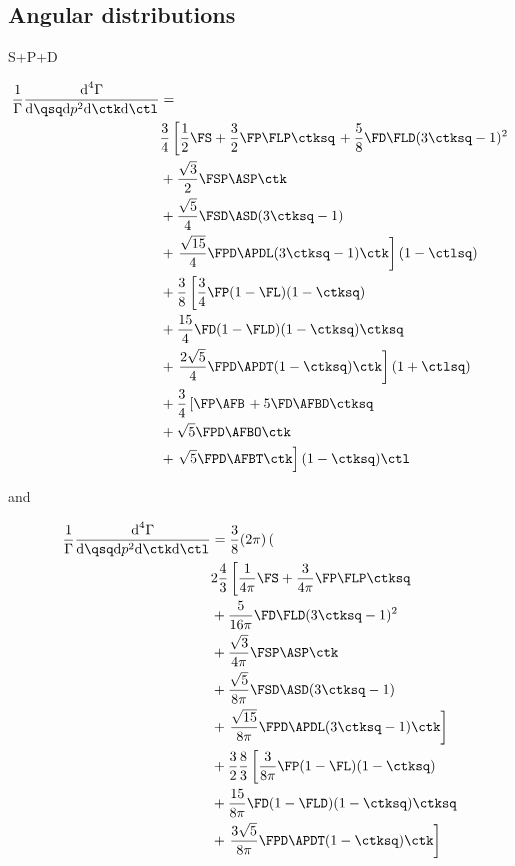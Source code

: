 \subsection{Angular distributions}

S+P+D

\begin{align}
\frac{1}{\Gamma} \frac{\text{d}^4\Gamma}{ \text{d}\qsq \text{d}p^2 \text{d}\ctk \text{d}\ctl} &=  \nonumber \\
  &     \frac{3}{4}    \left[  \frac{1}{2}  \FS + \frac{3}{2} \FP \FLP  \ctksq \right. +  \frac{5}{8} \FD \FLD  (3\ctksq-1)^2   \nonumber \\
  & + \frac{ \sqrt{3}}{2} \FSP \ASP \ctk   \nonumber \\
  & + \frac{\sqrt{5}}{4} \FSD \ASD (3\ctksq-1)\nonumber \\
  & + \left. \frac{\sqrt{15}}{4} \FPD \APDL (3\ctksq-1) \ctk  \right] ( 1-\ctlsq) \nonumber \\
  & + \frac{3}{8} \left[ \frac{3}{4} \FP (1-\FL) (1-\ctksq) \right.  \nonumber \\
  & + \frac{15}{4} \FD (1-\FLD) (1-\ctksq) \ctksq   \nonumber \\
  & + \left. \frac{2\sqrt{5}}{4} \FPD \APDT  (1-\ctksq)\ctk \right] ( 1 + \ctlsq ) \nonumber \\  
  & +  \frac{3}{4}   \left[   \FP \AFB  \right.  +  5  \FD \AFBD  \ctksq  \nonumber \\
  & + \sqrt{5} \FPD \AFBO   \ctk  \nonumber \\
  & + \left. \sqrt{5}  \FPD \AFBT  \ctk \right]  (1-\ctksq) \ctl \nonumber \\
\end{align}

and 

\begin{align}
\frac{1}{\Gamma} \frac{\text{d}^4\Gamma}{ \text{d}\qsq \text{d}p^2 \text{d}\ctk \text{d}\ctl} &= \frac{3}{8} (2\pi) \left( \right.  \nonumber \\
  &  2 \frac{4}{3} \left[   \frac{1}{4\pi} \FS + \frac{3}{4\pi} \FP \FLP  \ctksq \right. \nonumber \\
  & +  \frac{5}{16\pi} \FD \FLD  (3\ctksq-1)^2   \nonumber \\
  & + \frac{\sqrt{3}}{4\pi} \FSP \ASP \ctk   \nonumber \\
  & +  \frac{\sqrt{5}}{8\pi} \FSD \ASD (3\ctksq-1)\nonumber \\
  & + \left.  \frac{\sqrt{15}}{8\pi} \FPD \APDL (3\ctksq-1) \ctk  \right]  \nonumber \\
  & + \frac{3}{2} \frac{8}{3} \left[ \frac{3}{8\pi} \FP  (1-\FL) (1-\ctksq) \right.  \nonumber \\
  & + \frac{15}{8\pi} \FD (1-\FLD) (1-\ctksq) \ctksq   \nonumber \\
  & + \left. \frac{3\sqrt{5}}{8\pi} \FPD \APDT (1-\ctksq)\ctk  \right]  \nonumber \\  
\end{align}



